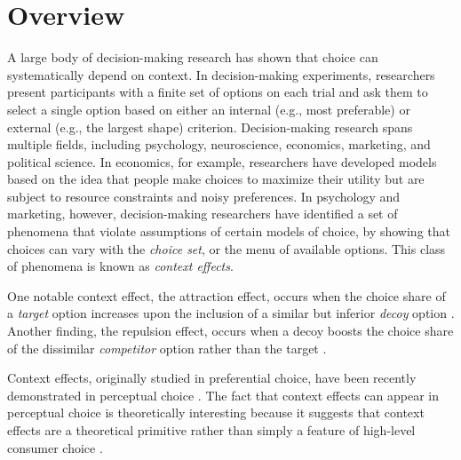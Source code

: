 \section{Overview}
A large body of decision-making research has shown that choice can systematically depend on context. In decision-making experiments, researchers present participants with a finite set of options on each trial and ask them to select a single option based on either an internal (e.g., most preferable) or external (e.g., the largest shape) criterion. Decision-making research spans multiple fields, including psychology, neuroscience, economics, marketing, and political science. In economics, for example, researchers have developed models based on the idea that people make choices to maximize their utility but are subject to resource constraints and noisy preferences. In psychology and marketing, however, decision-making researchers have identified a set of phenomena that violate assumptions of certain models of choice, by showing that choices can vary with the \textit{choice set}, or the menu of available options. This class of phenomena is known as \textit{context effects}.


One notable context effect, the attraction effect, occurs when the choice share of a \textit{target} option increases upon the inclusion of a similar but inferior \textit{decoy} option \parencite{huberAddingAsymmetricallyDominated1982d}. Another finding, the repulsion effect, occurs when a decoy boosts the choice share of the dissimilar \textit{competitor} option rather than the target \parencite{simonson2014vices}.  

Context effects, originally studied in preferential choice, have been recently demonstrated in perceptual choice \parencite{trueblood2013not,spektorWhenGoodLooks2018b,liaoInfluenceDistanceDecoy2021,spektorRepulsionEffectPreferential2022,yearsleyContextEffectsSimilarity2022,truebloodPhantomDecoyEffect2017c, turnerCompetingTheoriesMultialternative2018a, evansImpactPresentationOrder2021}. The fact that context effects can appear in perceptual choice is theoretically interesting because it suggests that context effects are a theoretical primitive rather than simply a feature of high-level consumer choice \parencite{trueblood2013not}. 

